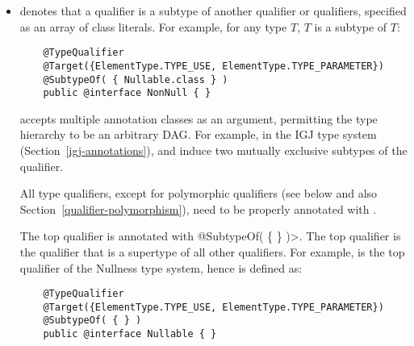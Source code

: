 \begin{itemize}

\item {} denotes that a qualifier is a subtype of
  another qualifier or qualifiers, specified as an array of class
  literals.  For example, for any type $T$,
   $T$ is a subtype of  $T$:

  \begin{Verbatim}
    @TypeQualifier
    @Target({ElementType.TYPE_USE, ElementType.TYPE_PARAMETER})
    @SubtypeOf( { Nullable.class } )
    public @interface NonNull { }
  \end{Verbatim}



   accepts multiple annotation classes as an argument,
  permitting the type hierarchy to be an arbitrary DAG\@.  For example,
  in the IGJ type system (Section~\ref{igj-annotations}), 
  and  induce two mutually exclusive subtypes of the
   qualifier.


  All type qualifiers, except for polymorphic qualifiers (see below and
  also Section~\ref{qualifier-polymorphism}), need to be
  properly annotated with .

  The top qualifier is annotated with
  \<@SubtypeOf( \{ \} )>.  The top qualifier is the qualifier that is
  a supertype of all other qualifiers.  For example, 
  is the top qualifier of the Nullness type system, hence is defined as:

  \begin{Verbatim}
    @TypeQualifier
    @Target({ElementType.TYPE_USE, ElementType.TYPE_PARAMETER})
    @SubtypeOf( { } )
    public @interface Nullable { }
  \end{Verbatim}


\end{itemize}
